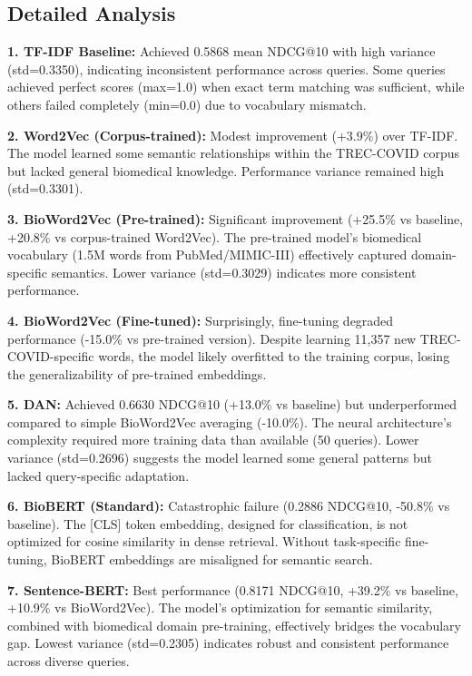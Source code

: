 \documentclass[sigconf,nonacm]{acmart}
\begin{document}
\subsection{Detailed Analysis}

\textbf{1. TF-IDF Baseline:} Achieved 0.5868 mean NDCG@10 with high variance (std=0.3350), indicating inconsistent performance across queries. Some queries achieved perfect scores (max=1.0) when exact term matching was sufficient, while others failed completely (min=0.0) due to vocabulary mismatch.

\textbf{2. Word2Vec (Corpus-trained):} Modest improvement (+3.9\%) over TF-IDF. The model learned some semantic relationships within the TREC-COVID corpus but lacked general biomedical knowledge. Performance variance remained high (std=0.3301).

\textbf{3. BioWord2Vec (Pre-trained):} Significant improvement (+25.5\% vs baseline, +20.8\% vs corpus-trained Word2Vec). The pre-trained model's biomedical vocabulary (1.5M words from PubMed/MIMIC-III) effectively captured domain-specific semantics. Lower variance (std=0.3029) indicates more consistent performance.

\textbf{4. BioWord2Vec (Fine-tuned):} Surprisingly, fine-tuning degraded performance (-15.0\% vs pre-trained version). Despite learning 11,357 new TREC-COVID-specific words, the model likely overfitted to the training corpus, losing the generalizability of pre-trained embeddings.

\textbf{5. DAN:} Achieved 0.6630 NDCG@10 (+13.0\% vs baseline) but underperformed compared to simple BioWord2Vec averaging (-10.0\%). The neural architecture's complexity required more training data than available (50 queries). Lower variance (std=0.2696) suggests the model learned some general patterns but lacked query-specific adaptation.

\textbf{6. BioBERT (Standard):} Catastrophic failure (0.2886 NDCG@10, -50.8\% vs baseline). The [CLS] token embedding, designed for classification, is not optimized for cosine similarity in dense retrieval. Without task-specific fine-tuning, BioBERT embeddings are misaligned for semantic search.

\textbf{7. Sentence-BERT:} Best performance (0.8171 NDCG@10, +39.2\% vs baseline, +10.9\% vs BioWord2Vec). The model's optimization for semantic similarity, combined with biomedical domain pre-training, effectively bridges the vocabulary gap. Lowest variance (std=0.2305) indicates robust and consistent performance across diverse queries.
\end{document}
